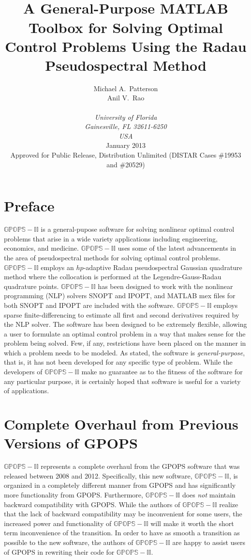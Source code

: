 \documentclass[10pt]{article}
\title{\vspace{2.5in}{\bf $\mathbb{GPOPS-II}$ Version 1.0:} \vspace{12pt}\\
  {\bf A General-Purpose MATLAB Toolbox for Solving Optimal Control
    Problems Using the Radau Pseudospectral Method}}
\author{Michael A.~Patterson \\ Anil V.~Rao \\\\ {\em University of
    Florida} \\ {\em Gainesville, FL 32611-6250} \\ {\em USA}
  \vspace{24pt} \\ January 2013 \vspace{36pt} \\ Approved for Public
  Release, Distribution Unlimited (DISTAR Cases \#19953 and \#20529)}
\date{}
\begin{document}
\setcounter{tocdepth}{1}



\maketitle
\clearpage


\section*{Preface}

$\mathbb{GPOPS-II}$ is a general-pupose software for solving nonlinear
optimal control problems that arise in a wide variety applications
including engineering, economics, and medicine.  $\mathbb{GPOPS-II}$ uses
some of the latest advancements in the area of pseudospectral methods
for solving optimal control problems.  $\mathbb{GPOPS-II}$ employs an 
$hp$-adaptive Radau pseudospectral Gaussian quadrature method where
the collocation is performed at the Legendre-Gauss-Radau quadrature
points.  $\mathbb{GPOPS-II}$ has been designed to work with the nonlinear
programming (NLP) solvers SNOPT and IPOPT, and MATLAB mex files for
both SNOPT and IPOPT are included with the software.  $\mathbb{GPOPS-II}$
employs sparse finite-differencing to estimate all first and second
derivatives required by the NLP solver.  The software has been
designed to be extremely flexible, allowing a user to formulate an
optimal control problem in a way that makes sense for the problem
being solved.  Few, if any, restrictions have been placed on the
manner in which a problem needs to be modeled.  As stated, the
software is {\em general-purpose}, that is, it has not been developed
for any specific type of problem.  While the developers of
$\mathbb{GPOPS-II}$ make no guarantee as to the fitness of the software for
any particular purpose, it is certainly hoped that software is useful
for a variety of applications.

\section*{Complete Overhaul from Previous Versions of GPOPS}

$\mathbb{GPOPS-II}$ represents a complete overhaul from the GPOPS software that was
released between 2008 and 2012.  Specifically, this new software,
$\mathbb{GPOPS-II}$, is organized in a completely different manner from GPOPS and
has significantly more functionality from GPOPS.  Furthermore, $\mathbb{GPOPS-II}$
does {\em not} maintain backward compatibility with GPOPS.  While the
authors of $\mathbb{GPOPS-II}$ realize that the lack of backward compatibility may
be inconvenient for some users, the increased power and functionality
of $\mathbb{GPOPS-II}$ will make it worth the short term inconvenience of the
transition.  In order to have as smooth a transition as possible to
the new software, the authors of $\mathbb{GPOPS-II}$ are happy to assist users of
GPOPS in rewriting their code for $\mathbb{GPOPS-II}$.  
\end{document}
